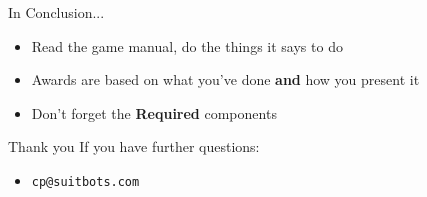 \documentclass{beamer}
\begin{document}
  \begin{frame}{In Conclusion...}
    \begin{itemize}
    \item{Read the game manual, do the things it says to do}
    \item{Awards are based on what you've done \textbf{and} how you present it}
    \item{Don't forget the \textbf{Required} components}
    \end{itemize}
  \end{frame}

  \begin{frame}{Thank you}
    If you have further questions:
    \begin{itemize}
    \item \texttt{cp@suitbots.com}
    \end{itemize}
  \end{frame}
\end{document}
